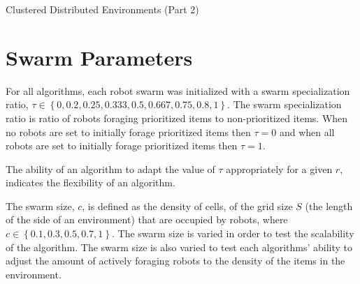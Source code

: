 \begin{algorithm}

\caption{Clustered Distributed Environments (Part 2)}
\label{algorithm:clustered2}
\begin{algorithmic}[1]
	  \State {}
	  \State {}
	  \State {}
	
		  \State {}
		  \State {}
		  \State {}
				
        	\State {}
        	\State {}
				  \State {}
				  \State {}	
			  \EndIf
		  \EndWhile
		\EndIf
	\EndWhile
\EndFunction
\end{algorithmic}
\end{algorithm}


\section{Swarm Parameters}
\label{swarmparameters}

For all algorithms, each robot swarm was initialized with 
a swarm specialization ratio, $\tau\in\left\{0, 0.2, 0.25, 0.333, 0.5, 0.667, 0.75, 0.8,1\right\}$. The swarm specialization ratio is ratio of robots foraging prioritized items to non-prioritized items. When no robots are set to initially forage prioritized items then $\tau=0$ and when all robots are set to initially forage prioritized items then $\tau=1$.

The ability of an algorithm to adapt the value of $\tau$ appropriately for a given $r$, indicates the flexibility of an algorithm.

The swarm size, $c$, is defined as the density of cells, of the grid size $S$ (the length of the side of an environment) that are occupied by robots, where $c\in\left\{0.1, 0.3, 0.5, 0.7, 1\right\}$. The swarm size is varied in order to test the scalability of the algorithm. The swarm size is also varied to test each algorithms' ability to adjust the amount of actively  foraging robots to the density of the items in the environment.

